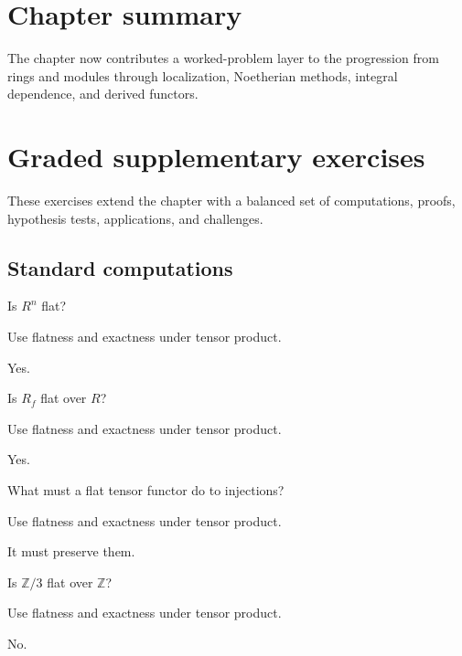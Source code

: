 \section*{Chapter summary}
The chapter now contributes a worked-problem layer to the progression from rings and modules through localization, Noetherian methods, integral dependence, and derived functors.
\section{Graded supplementary exercises}
These exercises extend the chapter with a balanced set of computations, proofs, hypothesis tests, applications, and challenges.

\subsection*{Standard computations}

\begin{exercise}\label{exr:v14-expand-01}
Is $R^n$ flat?
\end{exercise}
\begin{hint}
Use flatness and exactness under tensor product.
\end{hint}
\begin{solution}
Yes.
\end{solution}

\begin{exercise}\label{exr:v14-expand-02}
Is $R_f$ flat over $R$?
\end{exercise}
\begin{hint}
Use flatness and exactness under tensor product.
\end{hint}
\begin{solution}
Yes.
\end{solution}

\begin{exercise}\label{exr:v14-expand-03}
What must a flat tensor functor do to injections?
\end{exercise}
\begin{hint}
Use flatness and exactness under tensor product.
\end{hint}
\begin{solution}
It must preserve them.
\end{solution}

\begin{exercise}\label{exr:v14-expand-04}
Is $\mathbb Z/3$ flat over $\mathbb Z$?
\end{exercise}
\begin{hint}
Use flatness and exactness under tensor product.
\end{hint}
\begin{solution}
No.
\end{solution}

